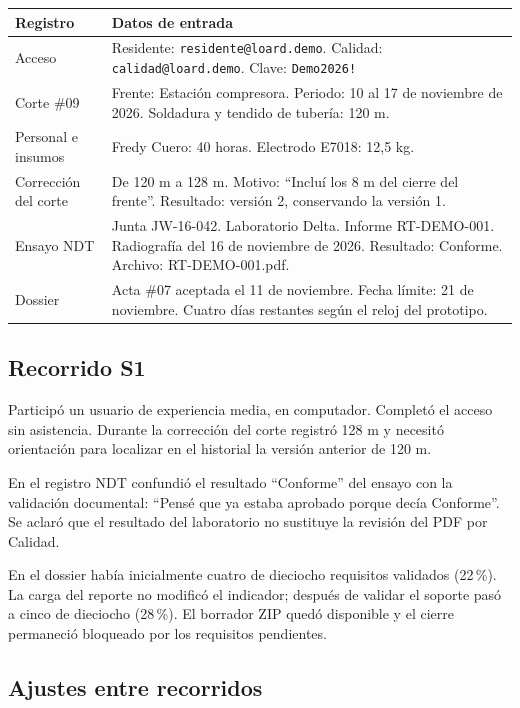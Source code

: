 \documentclass[11pt]{article}
\begin{document}
\begin{longtable}{>{\raggedright\arraybackslash}p{3.4cm} >{\raggedright\arraybackslash}p{12.1cm}}
\toprule \textbf{Registro} & \textbf{Datos de entrada} \\ \midrule \endhead
\bottomrule \endfoot
Acceso & Residente: \texttt{residente@loard.demo}. Calidad: \texttt{calidad@loard.demo}. Clave: \texttt{Demo2026!} \\
Corte \#09 & Frente: Estación compresora. Periodo: 10 al 17 de noviembre de 2026. Soldadura y tendido de tubería: 120 m. \\
Personal e insumos & Fredy Cuero: 40 horas. Electrodo E7018: 12,5 kg. \\
Corrección del corte & De 120 m a 128 m. Motivo: ``Incluí los 8 m del cierre del frente''. Resultado: versión 2, conservando la versión 1. \\
Ensayo NDT & Junta JW-16-042. Laboratorio Delta. Informe RT-DEMO-001. Radiografía del 16 de noviembre de 2026. Resultado: Conforme. Archivo: RT-DEMO-001.pdf. \\
Dossier & Acta \#07 aceptada el 11 de noviembre. Fecha límite: 21 de noviembre. Cuatro días restantes según el reloj del prototipo. \\
\end{longtable}

\subsection*{Recorrido S1}

Participó un usuario de experiencia media, en computador. Completó el acceso sin asistencia. Durante la corrección del corte registró 128 m y necesitó orientación para localizar en el historial la versión anterior de 120 m.

En el registro NDT confundió el resultado ``Conforme'' del ensayo con la validación documental: ``Pensé que ya estaba aprobado porque decía Conforme''. Se aclaró que el resultado del laboratorio no sustituye la revisión del PDF por Calidad.

En el dossier había inicialmente cuatro de dieciocho requisitos validados (22\,\%). La carga del reporte no modificó el indicador; después de validar el soporte pasó a cinco de dieciocho (28\,\%). El borrador ZIP quedó disponible y el cierre permaneció bloqueado por los requisitos pendientes.

\subsection*{Ajustes entre recorridos}
\end{document}
